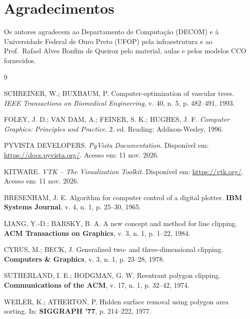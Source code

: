 \section*{Agradecimentos}
Os autores agradecem ao Departamento de Computação (DECOM) e à Universidade Federal de Ouro Preto (UFOP) pela infraestrutura e ao Prof.\ Rafael Alves Bonfim de Queiroz pelo material, aulas e pelos modelos CCO fornecidos.

\newpage
\sloppy
\begin{thebibliography}{9}

SCHREINER, W.; BUXBAUM, P.
Computer-optimization of vascular trees.
\textit{IEEE Transactions on Biomedical Engineering}, v. 40, n. 5, p. 482--491, 1993.

FOLEY, J. D.; VAN DAM, A.; FEINER, S. K.; HUGHES, J. F.
\textit{Computer Graphics: Principles and Practice}.
2. ed. Reading: Addison-Wesley, 1996.

PYVISTA DEVELOPERS.
\textit{PyVista Documentation}.
Disponível em: \url{https://docs.pyvista.org/}. Acesso em: 11 nov. 2026.

KITWARE.
\textit{VTK -- The Visualization Toolkit}.
Disponível em: \url{https://vtk.org/}. Acesso em: 11 nov. 2026.


 BRESENHAM, J. E. Algorithm for computer control of a digital plotter. \textbf{IBM Systems Journal}, v. 4, n. 1, p. 25--30, 1965.

 LIANG, Y.-D.; BARSKY, B. A. A new concept and method for line clipping. \textbf{ACM Transactions on Graphics}, v. 3, n. 1, p. 1--22, 1984.
  
 CYRUS, M.; BECK, J. Generalized two- and three-dimensional clipping. \textbf{Computers \& Graphics}, v. 3, n. 1, p. 23--28, 1978.
  
 SUTHERLAND, I. E.; HODGMAN, G. W. Reentrant polygon clipping. \textbf{Communications of the ACM}, v. 17, n. 1, p. 32--42, 1974.

 WEILER, K.; ATHERTON, P. Hidden surface removal using polygon area sorting. In: \textbf{SIGGRAPH '77}, p. 214--222, 1977.

\end{thebibliography}